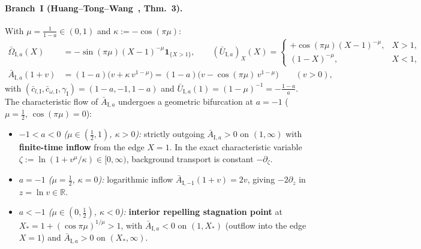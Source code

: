 \documentclass[11pt,a4paper]{article}
\begin{document}
\paragraph{Branch~I (Huang--Tong--Wang~\cite{HuangTongWang2026}, Thm.~3).}
With $\mu = \frac{1}{1-a} \in (0,1)$ and $\kappa := -\cos(\pi\mu)$:
\begin{align}
\bar\Omega_{\mathrm{I},a}(X) &= -\sin(\pi\mu)(X-1)^{-\mu}\mathbf{1}_{\{X>1\}}, \qquad
(\bar U_{\mathrm{I},a})_X(X) =
\begin{cases}
+\cos(\pi\mu)(X-1)^{-\mu}, & X > 1, \\
(1-X)^{-\mu}, & X < 1,
\end{cases} \nonumber\\
\bar A_{\mathrm{I},a}(1+v) &= (1-a)\big(v + \kappa\,v^{1-\mu}\big) = (1-a)\big(v - \cos(\pi\mu)\,v^{1-\mu}\big) \qquad (v > 0), \label{eq:branch1_A}
\end{align}
with $(\bar c_{l,\mathrm{I}}, \bar c_{\omega,\mathrm{I}}, \gamma_{\mathrm{I}}) = (1-a, -1, 1-a)$ and $\bar U_{\mathrm{I},a}(1) = (1-\mu)^{-1} = -\frac{1-a}{a}$. The characteristic flow of $\bar A_{\mathrm{I},a}$ undergoes a geometric bifurcation at $a = -1$ ($\mu = \frac{1}{2}$, $\cos(\pi\mu) = 0$):
\begin{itemize}
  \item \emph{$-1 < a < 0$ ($\mu \in (\frac{1}{2},1)$, $\kappa > 0$):} strictly outgoing $\bar A_{\mathrm{I},a} > 0$ on $(1,\infty)$ with \textbf{finite-time inflow} from the edge $X = 1$. In the exact characteristic variable $\zeta := \ln(1 + v^\mu/\kappa) \in [0,\infty)$, background transport is constant $-\partial_\zeta$.
  \item \emph{$a = -1$ ($\mu = \frac{1}{2}$, $\kappa = 0$):} logarithmic inflow $\bar A_{\mathrm{I},-1}(1+v) = 2v$, giving $-2\partial_z$ in $z = \ln v \in \mathbb{R}$.
  \item \emph{$a < -1$ ($\mu \in (0,\frac{1}{2})$, $\kappa < 0$):} \textbf{interior repelling stagnation point} at $X_* = 1 + (\cos\pi\mu)^{1/\mu} > 1$, with $\bar A_{\mathrm{I},a} < 0$ on $(1, X_*)$ (outflow into the edge $X = 1$) and $\bar A_{\mathrm{I},a} > 0$ on $(X_*, \infty)$.
\end{itemize}
\end{document}
